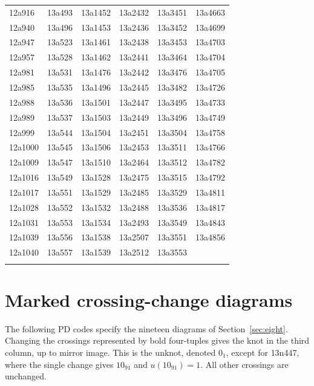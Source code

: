\documentclass[12pt, oneside]{amsart}
\newcommand{\kn}[2]{\textup{#1#2}}
\begin{document}
{\begin{longtable}{*{6}{>{\raggedright\arraybackslash}p{}}}
12a916 & 13a493 & 13a1452 & 13a2432 & 13a3451 & 13a4663 \\
12a940 & 13a496 & 13a1453 & 13a2436 & 13a3452 & 13a4699 \\
12a947 & 13a523 & 13a1461 & 13a2438 & 13a3453 & 13a4703 \\
12a957 & 13a528 & 13a1462 & 13a2441 & 13a3464 & 13a4704 \\
12a981 & 13a531 & 13a1476 & 13a2442 & 13a3476 & 13a4705 \\
12a985 & 13a535 & 13a1496 & 13a2445 & 13a3482 & 13a4726 \\
12a988 & 13a536 & 13a1501 & 13a2447 & 13a3495 & 13a4733 \\
12a989 & 13a537 & 13a1503 & 13a2449 & 13a3496 & 13a4749 \\
12a999 & 13a544 & 13a1504 & 13a2451 & 13a3504 & 13a4758 \\
12a1000 & 13a545 & 13a1506 & 13a2453 & 13a3511 & 13a4766 \\
12a1009 & 13a547 & 13a1510 & 13a2464 & 13a3512 & 13a4782 \\
12a1016 & 13a549 & 13a1528 & 13a2475 & 13a3515 & 13a4792 \\
12a1017 & 13a551 & 13a1529 & 13a2485 & 13a3529 & 13a4811 \\
12a1028 & 13a552 & 13a1532 & 13a2488 & 13a3536 & 13a4817 \\
12a1031 & 13a553 & 13a1534 & 13a2493 & 13a3549 & 13a4843 \\*
12a1039 & 13a556 & 13a1538 & 13a2507 & 13a3551 & 13a4856 \\*
12a1040 & 13a557 & 13a1539 & 13a2512 & 13a3553 &  \\*
\multicolumn{6}{@{}l@{}}{\usebox{\appendixLegendBox}} \\
\end{longtable}}



\section{Marked crossing-change diagrams}\label{app:diagrams}
The following PD codes specify the nineteen diagrams of
Section~\ref{sec:eight}. Changing the crossings represented by bold
four-tuples gives the knot in the third column, up to mirror image. This
is the unknot, denoted $0_1$, except for \kn{13n}{447}, where the single
change gives $10_{91}$ and $u(10_{91})=1$. All other crossings are unchanged.
\end{document}
